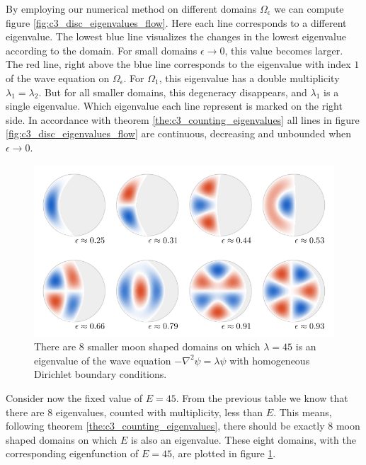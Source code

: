 By employing our numerical method on different domains $\Omega_\epsilon$ we can compute figure \ref{fig:c3_disc_eigenvalues_flow}. Here each line corresponds to a different eigenvalue. The lowest blue line visualizes the changes in the lowest eigenvalue according to the domain. For small domains $\epsilon \to 0$, this value becomes larger. The red line, right above the blue line corresponds to the eigenvalue with index $1$ of the wave equation on $\Omega_\epsilon$. For $\Omega_1$, this eigenvalue has a double multiplicity $\lambda_1 = \lambda_2$. But for all smaller domains, this degeneracy disappears, and $\lambda_1$ is a single eigenvalue. Which eigenvalue each line represent is marked on the right side. In accordance with theorem \ref{the:c3_counting_eigenvalues} all lines in figure \ref{fig:c3_disc_eigenvalues_flow} are continuous, decreasing and unbounded when $\epsilon \to 0$.


\begin{figure}
    \begin{center}
        \includegraphics[width=\textwidth]{img/chapter3/on_disc/solutions.pdf}
        \caption{There are $8$ smaller moon shaped domains on which $\lambda = 45$ is an eigenvalue of the wave equation $-\nabla^2 \psi = \lambda \psi$ with homogeneous Dirichlet boundary conditions.}
        \label{fig:c3_disc_solutions}
    \end{center}
\end{figure}


Consider now the fixed value of $E = 45$. From the previous table we know that there are $8$ eigenvalues, counted with multiplicity, less than $E$. This means, following theorem \ref{the:c3_counting_eigenvalues}, there should be exactly $8$ moon shaped domains on which $E$ is also an eigenvalue. These eight domains, with the corresponding eigenfunction of $E = 45$, are plotted in figure \ref{fig:c3_disc_solutions}.

\stopchapter

